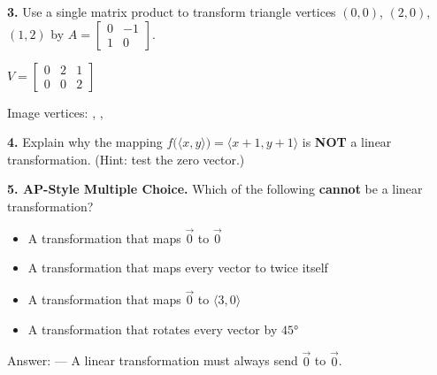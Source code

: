 \documentclass[10pt]{article}
\begin{document}
\begin{notesbox}
\textbf{3.} Use a single matrix product to transform triangle vertices
$(0,0)$, $(2,0)$, $(1,2)$ by $A=\begin{bmatrix}0&-1\\1&0\end{bmatrix}$.

\vspace{0.06in}
$V = \begin{bmatrix}0&2&1\\0&0&2\end{bmatrix}$

\vspace{0.06in}

\vspace{0.04in}
Image vertices: , \quad {}, \quad {}
\end{notesbox}

\vspace{0.10in}

\begin{notesbox}
\textbf{4.} Explain why the mapping
$f\bigl(\langle x,y\rangle\bigr)=\langle x+1,y+1\rangle$
is \textbf{NOT} a linear transformation. (Hint: test the zero vector.)

\vspace{0.06in}
\end{notesbox}

\vspace{0.10in}

\begin{notesbox}
\textbf{5. AP-Style Multiple Choice.}
Which of the following \textbf{cannot} be a linear transformation?

\vspace{0.08in}
\begin{itemize}[leftmargin=2em, itemsep=4pt]
  \item[(A)] A transformation that maps $\vec{0}$ to $\vec{0}$
  \item[(B)] A transformation that maps every vector to twice itself
  \item[(C)] A transformation that maps $\vec{0}$ to $\langle3,0\rangle$
  \item[(D)] A transformation that rotates every vector by $45°$
\end{itemize}

\vspace{0.08in}
Answer:  --- A linear transformation must always send $\vec{0}$ to $\vec{0}$.
\end{notesbox}
\end{document}
